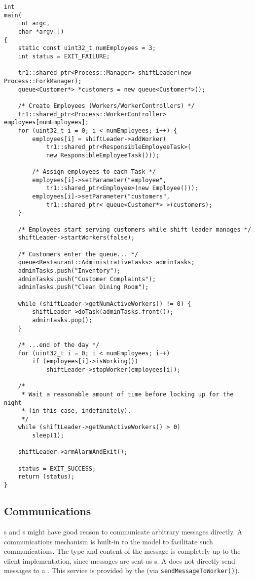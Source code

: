 \begin{lstlisting}[caption={Using \class{Manager}s and \class{WorkerController}s}, label=lst:process_manager-example]
int
main(
    int argc,
    char *argv[])
{
	static const uint32_t numEmployees = 3;
	int status = EXIT_FAILURE;
	
	tr1::shared_ptr<Process::Manager> shiftLeader(new Process::ForkManager);
	queue<Customer*> *customers = new queue<Customer*>();
	
	/* Create Employees (Workers/WorkerControllers) */
	tr1::shared_ptr<Process::WorkerController> employees[numEmployees];
	for (uint32_t i = 0; i < numEmployees; i++) {
		employees[i] = shiftLeader->addWorker(
		    tr1::shared_ptr<ResponsibleEmployeeTask>(
		    new ResponsibleEmployeeTask()));
		
		/* Assign employees to each Task */
		employees[i]->setParameter("employee",
		    tr1::shared_ptr<Employee>(new Employee()));
		employees[i]->setParameter("customers",
		    tr1::shared_ptr< queue<Customer*> >(customers);
	}
	
	/* Employees start serving customers while shift leader manages */
	shiftLeader->startWorkers(false);
	
	/* Customers enter the queue... */
	queue<Restaurant::AdministrativeTasks> adminTasks;
	adminTasks.push("Inventory");
	adminTasks.push("Customer Complaints");
	adminTasks.push("Clean Dining Room");
	
	while (shiftLeader->getNumActiveWorkers() != 0) {
		shiftLeader->doTask(adminTasks.front());
		adminTasks.pop();
	}
	
	/* ...end of the day */
	for (uint32_t i = 0; i < numEmployees; i++)
		if (employees[i]->isWorking())
			shiftLeader->stopWorker(employees[i]);
	
	/* 
	 * Wait a reasonable amount of time before locking up for the night
	 * (in this case, indefinitely).
	 */
	while (shiftLeader->getNumActiveWorkers() > 0)
		sleep(1);
		
	shiftLeader->armAlarmAndExit();
	
	status = EXIT_SUCCESS;	
	return (status);
}

\end{lstlisting}

\subsection{Communications}
\label{subsec:communications}

s and s might have good reason to communicate
arbitrary messages directly.  A communications mechanism is built-in to the
 model to facilitate such communications. 
The type and content of the message is completely up to the client
implementation, since messages are sent as s.
A  does not directly send messages to a
.  This service is provided by the 
(via \texttt{send\-Message\-To\-Worker()}).

